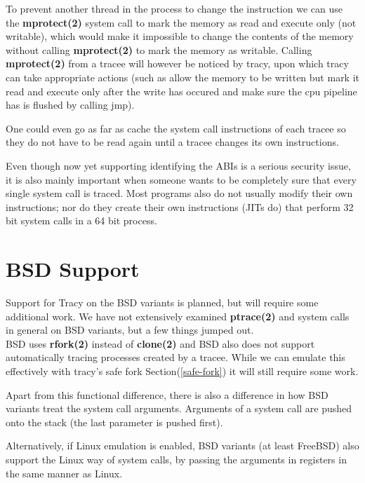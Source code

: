 \documentclass[a4paper, 10pt]{report}
\begin{document}
To prevent another thread in the process to change the instruction we can
use the \textbf{mprotect(2)} system call to mark the memory as read and execute
only (not writable), which would make it impossible to change the contents of
the memory without calling \textbf{mprotect(2)} to mark the memory as writable.
Calling \textbf{mprotect(2)} from a tracee will however be noticed by tracy,
upon which tracy can take appropriate actions (such as allow the memory to be
written but mark it read and execute only after the write has occured and make
sure the cpu pipeline has is flushed by calling jmp).

One could even go as far as cache the system call instructions of each tracee
so they do not have to be read again until a tracee changes its own
instructions.

Even though now yet supporting identifying the ABIs is a serious security issue,
it is also mainly important when someone wants to be completely sure that every
single system call is traced. Most programs also do not usually modify their
own instructions; nor do they create their own instructions (JITs do)
that perform 32 bit system calls in a 64 bit process.

\section{BSD Support}

Support for Tracy on the BSD variants is planned, but will require some
additional work. We have not extensively examined \textbf{ptrace(2)} and
system calls in general on BSD variants, but a few things jumped out. \\

BSD uses \textbf{rfork(2)} instead of \textbf{clone(2)} and BSD also does
not support automatically tracing processes created by a tracee. While
we can emulate this effectively with tracy's safe fork
Section(\ref{safe-fork}) it will still require some work.

Apart from this functional difference, there is also a difference in
how BSD variants treat the system call arguments. Arguments of a system
call are pushed onto the stack (the last parameter is pushed first).
\cite{int80h}

Alternatively, if Linux emulation is enabled, BSD variants (at least FreeBSD)
also support the Linux way of system calls, by passing the arguments in
registers in the same manner as Linux.
\end{document}
